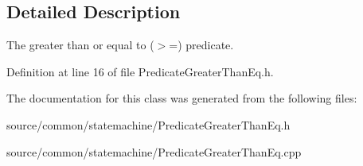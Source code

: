 \subsection{Detailed Description}
The greater than or equal to ($>$=) predicate. 

Definition at line 16 of file Predicate\-Greater\-Than\-Eq.\-h.



The documentation for this class was generated from the following files\-:\begin{DoxyCompactItemize}
\item 
source/common/statemachine/Predicate\-Greater\-Than\-Eq.\-h\item 
source/common/statemachine/Predicate\-Greater\-Than\-Eq.\-cpp\end{DoxyCompactItemize}
